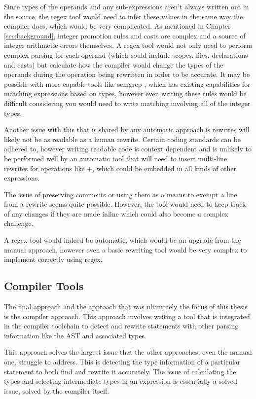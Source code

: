 Since types of the operands and any sub-expressions aren't always written out in the source, the regex tool would need to infer these values in the same way the compiler does, which would be very complicated. As mentioned in Chapter \ref{sec:background}, integer promotion rules and casts are complex and a source of integer arithmetic errors themselves. A regex tool would not only need to perform complex parsing for each operand (which could include scopes, files, declarations and casts) but calculate how the compiler would change the types of the operands during the operation being rewritten in order to be accurate. It may be possible with more capable tools like semgrep \cite{semgrep}, which has existing capabilities for matching expressions based on types, however even writing these rules would be difficult considering you would need to write matching involving all of the integer types.

Another issue with this that is shared by any automatic approach is rewrites will likely not be as readable as a human rewrite. Certain coding standards can be adhered to, however writing readable code is context dependent and is unlikely to be performed well by an automatic tool that will need to insert multi-line rewrites for operations like +, which could be embedded in all kinds of other expressions.

The issue of preserving comments or using them as a means to exempt a line from a rewrite seems quite possible. However, the tool would need to keep track of any changes if they are made inline which could also become a complex challenge.

A regex tool would indeed be automatic, which would be an upgrade from the manual approach, however even a basic rewriting tool would be very complex to implement correctly using regex.

\subsection{Compiler Tools}

The final approach and the approach that was ultimately the focus of this thesis is the compiler approach.
This approach involves writing a tool that is integrated in the compiler toolchain to detect and rewrite statements with other parsing information like the AST and associated types.

This approach solves the largest issue that the other approaches, even the manual one, struggle to address. This is detecting the type information of a particular statement to both find and rewrite it accurately. The issue of calculating the types and selecting intermediate types in an expression is essentially a solved issue, solved by the compiler itself.


